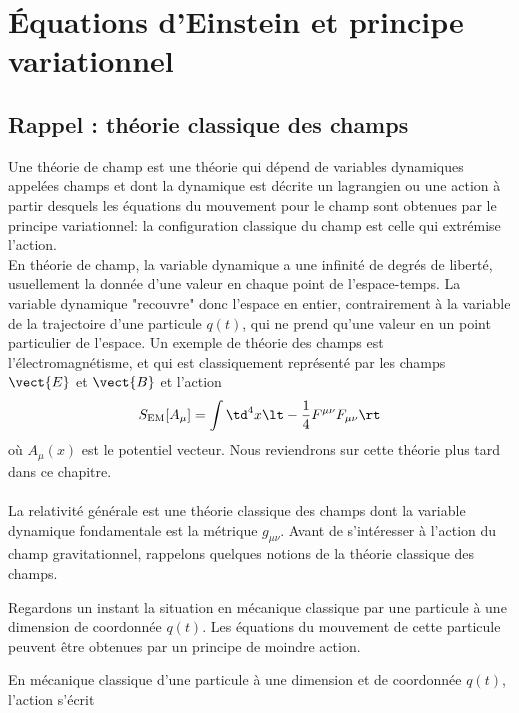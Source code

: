 \section{Équations d'Einstein et principe variationnel}
\subsection{Rappel : théorie classique des champs}
Une théorie de champ est une théorie qui dépend de variables dynamiques appelées champs et dont la dynamique est décrite un lagrangien ou une action à partir desquels les équations du mouvement pour le champ sont obtenues par le principe variationnel: la configuration classique du champ est celle qui extrémise l'action. \\
En théorie de champ, la variable dynamique a une infinité de degrés de liberté, usuellement la donnée d'une valeur en chaque point de l'espace-temps. La variable dynamique "recouvre" donc l'espace en entier, contrairement à la variable de la trajectoire d'une particule $q(t)$, qui ne prend qu'une valeur en un point particulier de l'espace. Un exemple de théorie des champs est l'électromagnétisme, et qui est classiquement représenté par les champs $\vect{E}$ et $\vect{B}$ et l'action
\begin{equation}
    S_{\text{EM}}[A_\mu] = \int \td^4 x \lt - \frac{1}{4} F^{\mu\nu} F_{\mu\nu} \rt 
\end{equation}
où $A_\mu(x)$ est le potentiel vecteur. Nous reviendrons sur cette théorie plus tard dans ce chapitre.\\
\\
La relativité générale est une théorie classique des champs dont la variable dynamique fondamentale est la métrique $g_{\mu \nu}$. Avant de s'intéresser à l'action du champ gravitationnel, rappelons quelques notions de la théorie classique des champs.

Regardons un instant la situation en mécanique classique par une particule à une dimension de coordonnée $q(t)$. Les équations du mouvement de cette particule peuvent être obtenues par un principe de moindre action.

En mécanique classique d'une particule à une dimension et de coordonnée $q(t)$, l'action s'écrit

